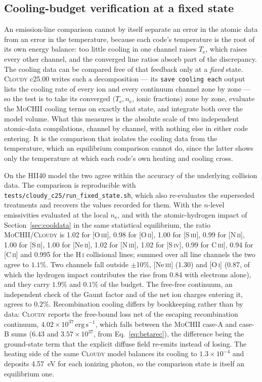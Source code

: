 \documentclass[twocolumn,linenumbers]{aastex702}
\newcommand{\code}[1]{\texttt{#1}}
\newcommand{\MoCHII}{\textsc{MoCHII}}
\newcommand{\HI}{H\,\textsc{i}}
\newcommand{\Te}{T_{\mathrm{e}}}
\newcommand{\nelec}{n_{\mathrm{e}}}
\begin{document}
\subsection{Cooling-budget verification at a fixed state}
\label{sec:coolcheck}

An emission-line comparison cannot by itself separate an error in the
atomic data from an error in the temperature, because each code's
temperature is the root of its own energy balance: too little cooling in
one channel raises $\Te$, which raises every other channel, and the
converged line ratios absorb part of the discrepancy.  The cooling data can
be compared free of that feedback only at a \emph{fixed} state.
\textsc{Cloudy} c25.00 writes such a decomposition --- its
\code{save cooling each} output lists the cooling rate of every ion and
every continuum channel zone by zone --- so the test is to take its
converged $(\Te, \nelec$, ionic fractions$)$ zone by zone, evaluate the
\MoCHII{} cooling terms on exactly that state, and integrate both over the
model volume.  What this measures is the absolute scale of two independent
atomic-data compilations, channel by channel, with nothing else in either
code entering.  It is the comparison that isolates the cooling data from
the temperature, which an equilibrium comparison cannot do, since the
latter shows only the temperature at which each code's own heating and
cooling cross.

On the HII40 model the two agree within the accuracy of the underlying
collision data.  The comparison is reproducible with
\code{tests/cloudy\_c25/run\_fixed\_state.sh}, which also re-evaluates the
superseded treatments and recovers the values recorded for them.  With the
$n$-level emissivities evaluated at the local $\nelec$, and with the
atomic-hydrogen impact of Section~\ref{sec:cooldata} in the same
statistical equilibrium, the ratio \MoCHII/\textsc{Cloudy} is 1.02 for [O\,\textsc{iii}],
0.98 for [O\,\textsc{ii}], 1.00 for [S\,\textsc{iii}], 0.99 for
[N\,\textsc{ii}], 1.00 for [S\,\textsc{ii}], 1.00 for [Ne\,\textsc{ii}],
1.02 for [N\,\textsc{iii}], 1.02 for [S\,\textsc{iv}], 0.99 for
C\,\textsc{iii}], 0.94 for [C\,\textsc{ii}] and 0.995 for the \HI{}
collisional lines; summed over all line channels the two agree to $1.1\%$.
Two channels fall outside $\pm$10\%, [Ne\,\textsc{iii}] (1.30) and
[O\,\textsc{i}] (0.87, of which the hydrogen impact contributes the rise from
0.84 with electrons alone), and they carry $1.9\%$ and $0.1\%$ of the
budget.
The free-free continuum, an independent
check of the Gaunt factor and of the net ion charges entering it, agrees to
$0.2\%$.  Recombination cooling differs by bookkeeping rather than by data:
\textsc{Cloudy} reports the free-bound loss net of the escaping
recombination continuum, $4.02\times10^{37}\,\mathrm{erg\,s^{-1}}$, which
falls between the \MoCHII{} case-A and case-B sums ($6.43$ and
$3.57\times10^{37}$, from Eq.~\ref{eq:betarec}), the difference being the
ground-state term that the explicit diffuse field re-emits instead of
losing.  The heating side of the
same \textsc{Cloudy} model balances its cooling to $1.3\times10^{-4}$ and
deposits 4.57~eV for each ionizing photon, so the comparison state is
itself an equilibrium one.
\end{document}
